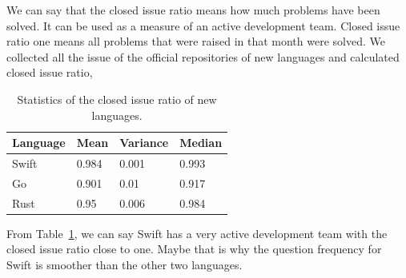 We can say that the closed issue ratio means how much problems have been solved. It can be used as a measure of an active development team. Closed issue ratio one means all problems that were raised in that month were solved. We collected all the issue of the official repositories of new languages and calculated closed issue ratio,

\begin{table}[]

\begin{tabular}{|l|l|l|l|}
\hline
 Language& Mean& Variance& Median\\ \hline
 Swift &  0.984  & 0.001 & 0.993 \\ \hline
 Go    &  0.901  & 0.01  & 0.917 \\ \hline
 Rust  &  0.95   & 0.006 & 0.984 \\ \hline

\end{tabular}%

\caption{Statistics of the closed issue ratio of new  languages.}
\label{table:Issue ratio}
\end{table}
From Table~\ref{table:Issue ratio}, we can say Swift has a very active development team with the closed issue ratio close to one. Maybe that is why the question frequency for Swift is smoother than the other two languages.
\fi

